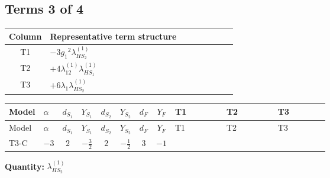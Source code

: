 \documentclass[8pt]{article}
\begin{document}
\begin{landscape}
\subsection*{Terms 3 of 4}
\begin{center}
\begin{tabular}{@{}c >{\raggedright\arraybackslash}p{0.82\linewidth}@{}}
\toprule
Column & Representative term structure \\
\midrule
T1 & \(\displaystyle -3 {g_1}^2 {\lambda_{HS_2}^{(1)}}\) \\
\midrule
T2 & \(\displaystyle +4 {\lambda_{12}^{(1)}} {\lambda_{HS_1}^{(1)}}\) \\
\midrule
T3 & \(\displaystyle +6 {\lambda_1} {\lambda_{HS_2}^{(1)}}\) \\
\midrule
\bottomrule
\end{tabular}
\end{center}
\smallskip
\tiny
\begin{longtable}{@{}llcccccc >{\raggedright\arraybackslash}p{0.21\linewidth} >{\raggedright\arraybackslash}p{0.21\linewidth} >{\raggedright\arraybackslash}p{0.21\linewidth}@{}}
\toprule
Model & $\alpha$ & $d_{S_1}$ & $Y_{S_1}$ & $d_{S_2}$ & $Y_{S_2}$ & $d_F$ & $Y_F$ & T1 & T2 & T3 \\
\midrule
\endfirsthead
\toprule
Model & $\alpha$ & $d_{S_1}$ & $Y_{S_1}$ & $d_{S_2}$ & $Y_{S_2}$ & $d_F$ & $Y_F$ & T1 & T2 & T3 \\
\midrule
\endhead
T3-C & $-3$ & $2$ & $-\frac{3}{2}$ & $2$ & $-\frac{1}{2}$ & $3$ & $-1$ & \scriptsize\adjustbox{max width=\linewidth}{$\begin{gathered} -3 {g_1}^2 {\lambda_{HS_2}^{(1)}}\end{gathered}$} & \scriptsize\adjustbox{max width=\linewidth}{$\begin{gathered} +4 {\lambda_{12}^{(1)}} {\lambda_{HS_1}^{(1)}}\end{gathered}$} & \scriptsize\adjustbox{max width=\linewidth}{$\begin{gathered} +6 {\lambda_1} {\lambda_{HS_2}^{(1)}}\end{gathered}$} \\
\midrule
\bottomrule
\end{longtable}
\clearpage
\noindent\textbf{Quantity: }$\lambda_{HS_2}^{(1)}$\par\smallskip

\end{landscape}
\end{document}
